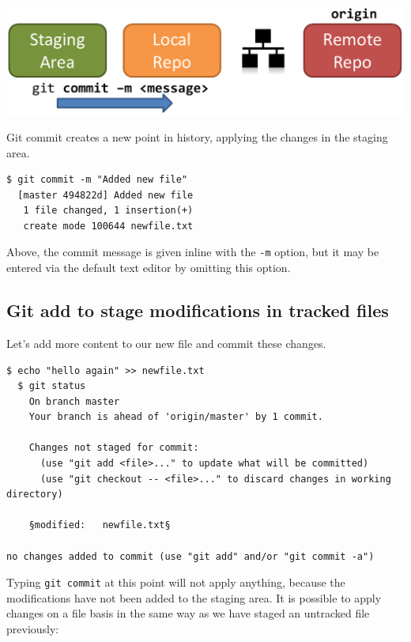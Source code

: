\documentclass{../common/tufte-latex/tufte-handout}
\begin{document}
\begin{marginfigure}%
  \centering
  \includegraphics[width=\linewidth]{gitcommit-schema.pdf}
  \label{fig:gitcommit}
  \caption{Git commit creates a new point in history, applying the changes in the staging area.}
\end{marginfigure}

\begin{lstlisting}[style=BashInputStyle]
  $ git commit -m "Added new file"
  [master 494822d] Added new file
   1 file changed, 1 insertion(+)
   create mode 100644 newfile.txt
\end{lstlisting}

Above, the commit message is given inline with the \texttt{-m} option, but it may be entered via the default text editor by omitting this option.

\subsection{Git add to stage modifications in tracked files}

Let's add more content to our new file and commit these changes.

\begin{lstlisting}[style=BashInputStyle]
  $ echo "hello again" >> newfile.txt
  $ git status
    On branch master
    Your branch is ahead of 'origin/master' by 1 commit.
  
    Changes not staged for commit:
      (use "git add <file>..." to update what will be committed)
      (use "git checkout -- <file>..." to discard changes in working directory)
   
    §modified:   newfile.txt§
   
no changes added to commit (use "git add" and/or "git commit -a")
\end{lstlisting}

Typing \texttt{git commit} at this point will not apply anything, because the modifications have not been added to the staging area.
It is possible to apply changes on a file basis in the same way as we have staged an untracked file previously:
\end{document}
